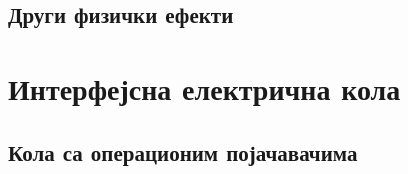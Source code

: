 \subsection{Други физички ефекти}


\setcounter{fid}{0}
\graphicspath{{./2_principi/2_ef/}}
\noindent

\vspace*{\ProblemSep}
\goodbreak


\setcounter{fid}{0}
\graphicspath{{./2_principi/2_ef/}}
\noindent

\vspace*{\ProblemSep}
\goodbreak


\setcounter{fid}{0}
\graphicspath{{./2_principi/2_ef/}}
\noindent

\vspace*{\ProblemSep}
\goodbreak


\setcounter{fid}{0}
\graphicspath{{./2_principi/2_ef/}}
\noindent

\vspace*{\ProblemSep}
\goodbreak


\setcounter{fid}{0}
\graphicspath{{./2_principi/2_ef/}}
\noindent

\vspace*{\ProblemSep}
\goodbreak


\setcounter{fid}{0}
\graphicspath{{./2_principi/2_ef/}}
\noindent

\vspace*{\ProblemSep}
\goodbreak


\setcounter{fid}{0}
\graphicspath{{./2_principi/2_ef/}}
\noindent

\vspace*{\ProblemSep}
\goodbreak


\setcounter{fid}{0}
\graphicspath{{./2_principi/2_ef/}}
\noindent

\vspace*{\ProblemSep}
\goodbreak
\section{Интерфејсна електрична кола
}
\subsection{Кола са операционим појачавачима}


\setcounter{fid}{0}
\graphicspath{{./3_if_kola/1_op/}}
\noindent

\vspace*{\ProblemSep}
\goodbreak



